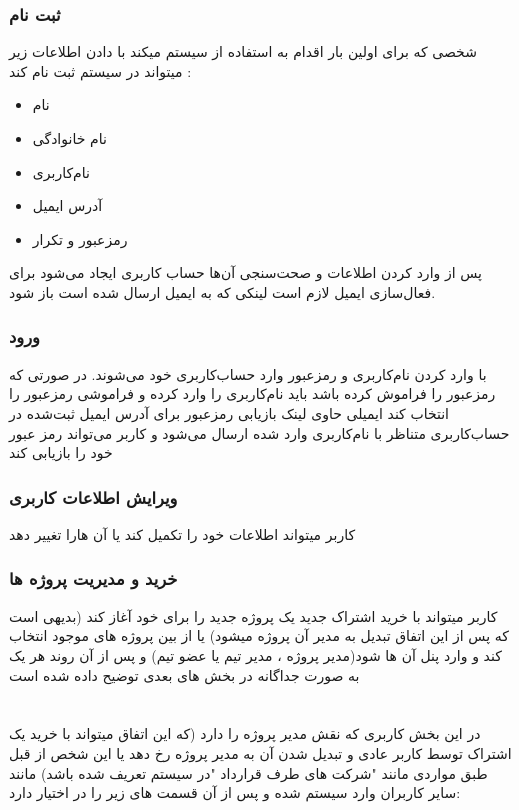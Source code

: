 \documentclass[10pt,a4paper]{article}
\begin{document}
\section*{
	ثبت نام 
}
شخصی که برای اولین بار اقدام به استفاده از سیستم میکند با دادن اطلاعات زیر میتواند در سیستم ثبت نام کند :
\begin{itemize}
	\item 
	نام
	\item
	نام خانوادگی
	\item
	نام‌کاربری
	\item
	آدرس ایمیل
	\item
	رمزعبور و تکرار
\end{itemize}
پس از وارد کردن اطلاعات و صحت‌سنجی آن‌ها حساب کاربری ایجاد می‌شود برای فعال‌سازی ایمیل لازم است لینکی که به ایمیل ارسال شده است باز شود.

\section*{
	ورود
}
با وارد کردن نام‌کاربری و رمزعبور وارد حساب‌کاربری‌ خود می‌شوند. در صورتی که رمزعبور را فراموش کرده باشد باید نام‌کاربری را وارد کرده و فراموشی رمزعبور را انتخاب کند ایمیلی حاوی لینک بازیابی رمزعبور برای آدرس ایمیل ثبت‌شده در حساب‌کاربری متناظر با نام‌کاربری وارد شده ارسال می‌شود و کاربر می‌تواند رمز عبور خود را بازیابی کند

\section*{
	ویرایش اطلاعات کاربری
}
کاربر میتواند اطلاعات خود را تکمیل کند یا آن هارا تغییر دهد

\section*{
	خرید و مدیریت پروژه ها
}
کاربر میتواند با خرید اشتراک جدید یک پروژه جدید را برای خود آغاز کند (بدیهی است که پس از این اتفاق تبدیل به مدیر آن پروژه میشود) یا از بین پروژه های موجود انتخاب کند و وارد پنل آن ها شود(مدیر پروژه ، مدیر تیم یا عضو تیم) و پس از آن روند هر یک به صورت جداگانه در بخش های بعدی توضیح داده شده است


\part{
}
در این بخش کاربری که نقش مدیر پروژه را دارد (که این اتفاق میتواند با خرید یک اشتراک توسط کاربر عادی و تبدیل شدن آن به مدیر پروژه رخ دهد یا این شخص از قبل طبق مواردی مانند "شرکت های طرف قرارداد "در سیستم تعریف شده باشد) مانند سایر کاربران وارد سیستم شده و پس از آن قسمت های زیر را در اختیار دارد:
\end{document}
